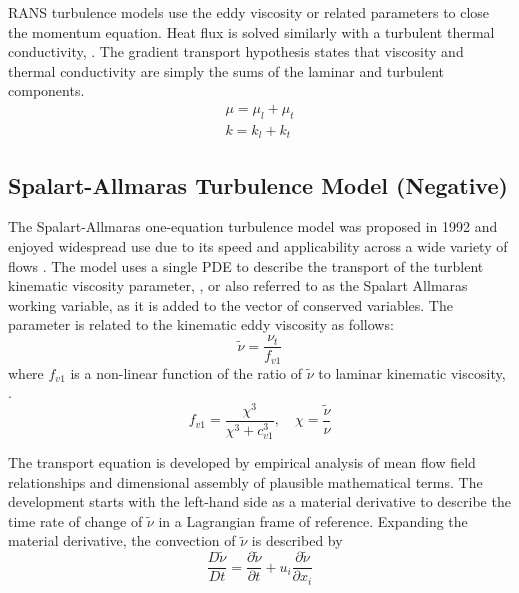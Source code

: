 RANS turbulence models use the eddy viscosity or related parameters to close the momentum equation. Heat flux is solved similarly with a turbulent thermal conductivity, . The gradient transport hypothesis states that viscosity and thermal conductivity are simply the sums of the laminar and turbulent components.
%
\begin{eqnarray}
  \mu = \mu_l + \mu_t  \\
  k = k_l + k_t
\end{eqnarray}
\par


\subsection{Spalart-Allmaras Turbulence Model (Negative)}

The Spalart-Allmaras one-equation turbulence model was proposed in 1992 and enjoyed widespread use due to its speed and applicability across a wide variety of flows \cite{Spalart1992}. The model uses a single PDE to describe the transport of the turblent kinematic viscosity parameter, , or also referred to as the Spalart Allmaras working variable, as it is added to the vector of conserved variables. The parameter is related to the kinematic eddy viscosity  as follows:
%
\begin{equation}
   \tilde{\nu} = \frac{\nu_t}{f_{v1}}
\end{equation}
%
where $f_{v1}$ is a non-linear function of the ratio of $\tilde{\nu}$ to laminar kinematic viscosity, .
%
$$ f_{v1} = \frac{\chi^3}{\chi^3 + c_{v1}^3}, \quad \chi = \frac{\tilde{\nu}}{\nu} $$

The transport equation is developed by empirical analysis of mean flow field relationships and dimensional assembly of plausible mathematical terms. The development starts with the left-hand side as a material derivative to describe the time rate of change of $\tilde{\nu}$ in a Lagrangian frame of reference. Expanding the material derivative, the convection of $\tilde{\nu}$ is described by
%
\begin{equation}
   \frac{D\tilde{\nu}}{Dt} = \frac{\partial \tilde{\nu}}{\partial t} + u_i\frac{\partial \tilde{\nu}}{\partial x_i}
\end{equation}

